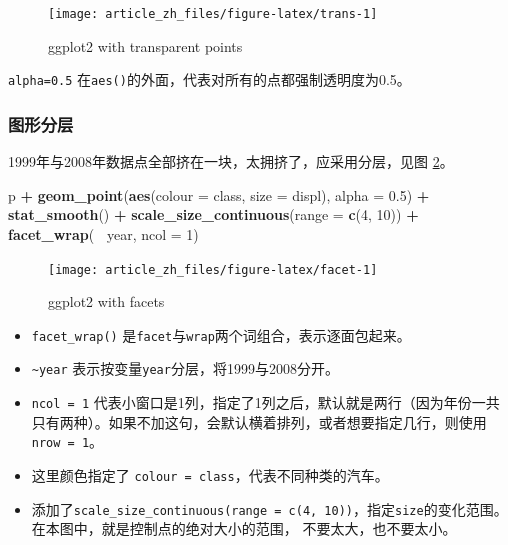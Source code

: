 \documentclass[]{article}
\newenvironment{Shaded}{\begin{snugshade}}{\end{snugshade}}
\newcommand{\DataTypeTok}[1]{\textcolor[rgb]{0.13,0.29,0.53}{#1}}
\newcommand{\DecValTok}[1]{\textcolor[rgb]{0.00,0.00,0.81}{#1}}
\newcommand{\FloatTok}[1]{\textcolor[rgb]{0.00,0.00,0.81}{#1}}
\newcommand{\KeywordTok}[1]{\textcolor[rgb]{0.13,0.29,0.53}{\textbf{#1}}}
\newcommand{\NormalTok}[1]{#1}
\newcommand{\OperatorTok}[1]{\textcolor[rgb]{0.81,0.36,0.00}{\textbf{#1}}}
\newcommand{\StringTok}[1]{\textcolor[rgb]{0.31,0.60,0.02}{#1}}
\providecommand{\tightlist}{%
  \setlength{\itemsep}{0pt}\setlength{\parskip}{0pt}}
\begin{document}
\begin{figure}

{\centering \texttt{[image: article\_zh\_files/figure-latex/trans-1]} 

}

\caption{ggplot2 with transparent points}\label{fig:trans}
\end{figure}

\texttt{alpha=0.5}
在\texttt{aes()}的外面，代表对所有的点都强制透明度为0.5。

\subsubsection{图形分层}

1999年与2008年数据点全部挤在一块，太拥挤了，应采用分层，见图
\ref{fig:facet}。

\begin{Shaded}
\begin{Highlighting}[]
\NormalTok{p }\OperatorTok{+}\StringTok{ }\KeywordTok{geom_point}\NormalTok{(}\KeywordTok{aes}\NormalTok{(}\DataTypeTok{colour =}\NormalTok{ class, }\DataTypeTok{size =}\NormalTok{ displ), }\DataTypeTok{alpha =} \FloatTok{0.5}\NormalTok{) }\OperatorTok{+}
\StringTok{  }\KeywordTok{stat_smooth}\NormalTok{() }\OperatorTok{+}\StringTok{ }\KeywordTok{scale_size_continuous}\NormalTok{(}\DataTypeTok{range =} \KeywordTok{c}\NormalTok{(}\DecValTok{4}\NormalTok{, }\DecValTok{10}\NormalTok{)) }\OperatorTok{+}
\StringTok{  }\KeywordTok{facet_wrap}\NormalTok{(}\OperatorTok{~}\StringTok{ }\NormalTok{year, }\DataTypeTok{ncol =} \DecValTok{1}\NormalTok{)}
\end{Highlighting}
\end{Shaded}

\begin{figure}

{\centering \texttt{[image: article\_zh\_files/figure-latex/facet-1]} 

}

\caption{ggplot2 with facets}\label{fig:facet}
\end{figure}

\begin{itemize}
\tightlist
\item
  \texttt{facet\_wrap()}
  是\texttt{facet}与\texttt{wrap}两个词组合，表示逐面包起来。
\item
  \texttt{\textasciitilde{}year}
  表示按变量\texttt{year}分层，将1999与2008分开。
\item
  \texttt{ncol\ =\ 1}
  代表小窗口是1列，指定了1列之后，默认就是两行（因为年份一共只有两种）。如果不加这句，会默认横着排列，或者想要指定几行，则使用\texttt{nrow\ =\ 1}。
\item
  这里颜色指定了 \texttt{colour\ =\ class}，代表不同种类的汽车。
\item
  添加了\texttt{scale\_size\_continuous(range\ =\ c(4,\ 10))}，指定\texttt{size}的变化范围。在本图中，就是控制点的绝对大小的范围，
  不要太大，也不要太小。
\end{itemize}
\end{document}
